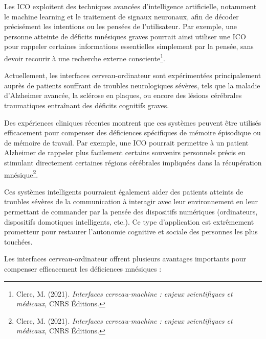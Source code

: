 \documentclass[11pt,a4paper]{report}
\begin{document}
Les ICO exploitent des techniques avancées d’intelligence artificielle, notamment le machine learning et le traitement de signaux neuronaux, afin de décoder précisément les intentions ou les pensées de l’utilisateur. Par exemple, une personne atteinte de déficits mnésiques graves pourrait ainsi utiliser une ICO pour rappeler certaines informations essentielles simplement par la pensée, sans devoir recourir à une recherche externe consciente\footnote{Clerc, M. (2021). \textit{Interfaces cerveau-machine : enjeux scientifiques et médicaux}, CNRS Éditions.}.

Actuellement, les interfaces cerveau-ordinateur sont expérimentées principalement auprès de patients souffrant de troubles neurologiques sévères, tels que la maladie d’Alzheimer avancée, la sclérose en plaques, ou encore des lésions cérébrales traumatiques entraînant des déficits cognitifs graves.

Des expériences cliniques récentes montrent que ces systèmes peuvent être utilisés efficacement pour compenser des déficiences spécifiques de mémoire épisodique ou de mémoire de travail. Par exemple, une ICO pourrait permettre à un patient Alzheimer de rappeler plus facilement certains souvenirs personnels précis en stimulant directement certaines régions cérébrales impliquées dans la récupération mnésique\footnote{Clerc, M. (2021). \textit{Interfaces cerveau-machine : enjeux scientifiques et médicaux}, CNRS Éditions.}.

Ces systèmes intelligents pourraient également aider des patients atteints de troubles sévères de la communication à interagir avec leur environnement en leur permettant de commander par la pensée des dispositifs numériques (ordinateurs, dispositifs domotiques intelligents, etc.). Ce type d’application est extrêmement prometteur pour restaurer l’autonomie cognitive et sociale des personnes les plus touchées.

Les interfaces cerveau-ordinateur offrent plusieurs avantages importants pour compenser efficacement les déficiences mnésiques :
\end{document}
